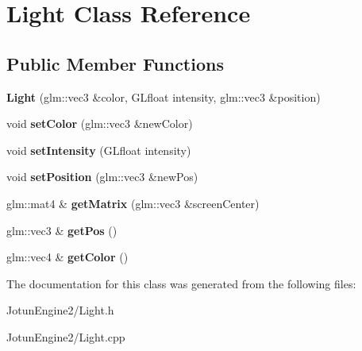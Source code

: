 \hypertarget{class_light}{\section{Light Class Reference}
\label{class_light}
}
\subsection*{Public Member Functions}
\begin{DoxyCompactItemize}
\item 
\hypertarget{class_light_a3ee6cf0a394f4ff263046543584c148f}{{\bfseries Light} (glm\-::vec3 \&color, G\-Lfloat intensity, glm\-::vec3 \&position)}\label{class_light_a3ee6cf0a394f4ff263046543584c148f}

\item 
\hypertarget{class_light_a32533dd404b4f87ef23cf3f2251a1044}{void {\bfseries set\-Color} (glm\-::vec3 \&new\-Color)}\label{class_light_a32533dd404b4f87ef23cf3f2251a1044}

\item 
\hypertarget{class_light_ab36e113dc58dd1e8dcd1f0d46d1a35c4}{void {\bfseries set\-Intensity} (G\-Lfloat intensity)}\label{class_light_ab36e113dc58dd1e8dcd1f0d46d1a35c4}

\item 
\hypertarget{class_light_ab730704ad744e475b294678c6d78ac3e}{void {\bfseries set\-Position} (glm\-::vec3 \&new\-Pos)}\label{class_light_ab730704ad744e475b294678c6d78ac3e}

\item 
\hypertarget{class_light_a4ecd02fffce9f2c1be9d79fdb90624ee}{glm\-::mat4 \& {\bfseries get\-Matrix} (glm\-::vec3 \&screen\-Center)}\label{class_light_a4ecd02fffce9f2c1be9d79fdb90624ee}

\item 
\hypertarget{class_light_ae7e48f654a0364732db94f4d4656b879}{glm\-::vec3 \& {\bfseries get\-Pos} ()}\label{class_light_ae7e48f654a0364732db94f4d4656b879}

\item 
\hypertarget{class_light_ab9718f63a12f2cb48401ef76987b21f9}{glm\-::vec4 \& {\bfseries get\-Color} ()}\label{class_light_ab9718f63a12f2cb48401ef76987b21f9}

\end{DoxyCompactItemize}


The documentation for this class was generated from the following files\-:\begin{DoxyCompactItemize}
\item 
Jotun\-Engine2/Light.\-h\item 
Jotun\-Engine2/Light.\-cpp\end{DoxyCompactItemize}
